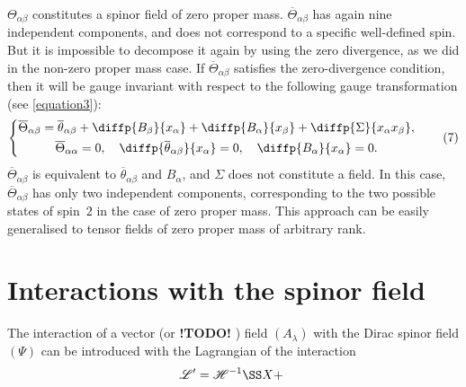 \documentclass{article}
\newcommand{\HH}{\mathscr{H}}
\newcommand{\LL}{\mathscr{L}}
\newcommand{\todo}{\textbf{ !TODO! }}
\newcommand{\oldpage}[1]{\marginpar{\footnotesize$\Big\vert$ \textit{p.~#1}}}
\begin{document}
\oldpage{13-06}
$\Theta_{\alpha\beta}$ constitutes a spinor field of zero proper mass.
$\overline{\Theta}_{\alpha\beta}$ has again nine independent components, and does not correspond to a specific well-defined spin.
But it is impossible to decompose it again by using the zero divergence, as we did in the non-zero proper mass case.
If $\overline{\Theta}_{\alpha\beta}$ satisfies the zero-divergence condition, then it will be gauge invariant with respect to the following gauge transformation (see \cref{equation3}):
\[
\label{equation7}
  \left\{
  \begin{gathered}
    \overline{\Theta}_{\alpha\beta} = \overline{\theta}_{\alpha\beta} + \diffp{{B_\beta}}{{x_\alpha}} + \diffp{{B_\alpha}}{{x_\beta}} + \diffp{\Sigma}{{x_\alpha}{x_\beta}},
  \\\overline{\Theta}_{\alpha\alpha} = 0,
    \quad \diffp{{\overline{\theta}_{\alpha\beta}}}{{x_\alpha}} = 0,
    \quad \diffp{{B_\alpha}}{{x_\alpha}} = 0.
  \end{gathered}
  \right.
  \tag{7}
\]
$\overline{\Theta}_{\alpha\beta}$ is equivalent to $\overline{\theta}_{\alpha\beta}$ and $B_\alpha$, and $\Sigma$ does not constitute a field.
In this case, $\overline{\Theta}_{\alpha\beta}$ has only two independent components, corresponding to the two possible states of spin~$2$ in the case of zero proper mass.
This approach can be easily generalised to tensor fields of zero proper mass of arbitrary rank.


\section{Interactions with the spinor field}
\label{section2}

The interaction of a vector (or \todo) field $(A_\lambda)$ with the Dirac spinor field $(\Psi)$ can be introduced with the Lagrangian of the interaction
\[
  \LL' = \HH^{-1}\SS X + \
\]
\end{document}
